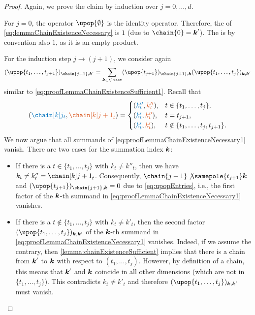 \begin{proof}
  Again, we prove the claim by induction over $j = 0, \dotsc, d$.
  
  For $j = 0$, the operator $\upop{\emptyset}$ is the identity operator.
  Therefore, the \lhs of \eqref{eq:lemmaChainExistenceNecessary} is $1$
  (due to $\chain{0} = \*k'$).
  The \rhs is by convention also $1$, as it is an empty product.
  
  For the induction step $j \to (j+1)$, we consider again
  \begin{equation}
    \label{eq:proofLemmaChainExistenceNecessary1}
    (\upop{t_1,\dotsc,t_{j+1}})_{\chain{j+1},\*k'}
    = \sum_{\*k \in \liset} (\upop{t_{j+1}})_{\chain{j+1},\*k}
    (\upop{t_1,\dotsc,t_j})_{\*k,\*k'}
  \end{equation}
  similar to \eqref{eq:proofLemmaChainExistenceSufficient1}.
  Recall that
  \begin{equation}
    (\textcolor{C0}{\chainuv{j}_t},
    \textcolor{C1}{\chainuv{j+1}_t})
    =
    \begin{cases}
      (\textcolor{C0}{k''_t}, \textcolor{C1}{k''_t}),&
      t \in \{t_1, \dotsc, t_j\},\\
      (\textcolor{C0}{k'_t}, \textcolor{C1}{k''_t}),&
      t = t_{j+1},\\
      (\textcolor{C0}{k'_t}, \textcolor{C1}{k'_t}),&
      t \notin \{t_1, \dotsc, t_j, t_{j+1}\}.
    \end{cases}
  \end{equation}
  We now argue that all summands of
  \eqref{eq:proofLemmaChainExistenceNecessary1} vanish.
  There are two cases for the summation index ${\boldsymbol{k}}$:
  \begin{itemize}
    \item
    If there is a $t \in \{t_1, \dotsc, t_j\}$ with $k_t \not= k''_t$,
    then we have $k_t \not= k''_t = \chainuv{j+1}_t$.
    Consequently, $\chain{j+1} \not\samepole{t_{j+1}} \*k$ and
    $(\upop{t_{j+1}})_{\chain{j+1},\*k} = 0$ due to \eqref{eq:upopEntries},
    i.e., the first factor of the ${\boldsymbol{k}}$-th summand in
    \eqref{eq:proofLemmaChainExistenceNecessary1} vanishes.
    
    \item
    If there is a $t \notin \{t_1, \dotsc, t_j\}$ with $k_t \not= k'_t$,
    then the second factor $(\upop{t_1,\dotsc,t_j})_{\*k,\*k'}$
    of the ${\boldsymbol{k}}$-th summand in
    \eqref{eq:proofLemmaChainExistenceNecessary1} vanishes.
    Indeed, if we assume the contrary,
    then \cref{lemma:chainExistenceSufficient} implies that there is
    a chain from ${\boldsymbol{k}}'$ to ${\boldsymbol{k}}$ with respect to $(t_1, \dotsc, t_j)$.
    However, by definition of a chain, this means that
    ${\boldsymbol{k}}'$ and ${\boldsymbol{k}}$ coincide in all other dimensions
    (which are not in $\{t_1, \dotsc, t_j\}$).
    This contradicts $k_t \not= k'_t$ and therefore
    $(\upop{t_1,\dotsc,t_j})_{\*k,\*k'}$ must vanish.
  \end{itemize}
  

\end{proof}
